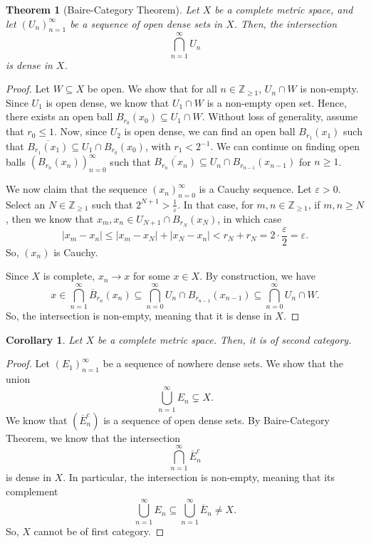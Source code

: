 \documentclass[a4paper, openany]{memoir}
\theoremstyle{definition}
\theoremstyle{plain}
\newtheorem{theorem}[definition]{Theorem}
\newtheorem{corollary}[definition]{Corollary}
\begin{document}
    \begin{theorem}[Baire-Category Theorem]
        Let $X$ be a complete metric space, and let $(U_n)_{n=1}^\infty$ be a sequence of open dense sets in $X$. Then, the intersection
        \[\bigcap_{n=1}^\infty U_n\]
        is dense in $X$.
    \end{theorem}
    \begin{proof}
        Let $W \subseteq X$ be open. We show that for all $n \in \mathbb{Z}_{\geq 1}$, $U_n \cap W$ is non-empty. Since $U_1$ is open dense, we know that $U_1 \cap W$ is a non-empty open set. Hence, there exists an open ball $B_{r_0}(x_0) \subseteq U_1 \cap W$. Without loss of generality, assume that $r_0 \leq 1$. Now, since $U_2$ is open dense, we can find an open ball $B_{r_1}(x_1)$ such that $\overline{B_{r_1}(x_1)} \subseteq U_1 \cap B_{r_0}(x_0)$, with $r_1 < 2^{-1}$. We can continue on finding open balls $(B_{r_n}(x_n))_{n=0}^\infty$ such that $\overline{B_{r_n}(x_n)} \subseteq U_n \cap B_{r_{n-1}}(x_{n-1})$ for $n \geq 1$. 
        
        We now claim that the sequence $(x_n)_{n=0}^\infty$ is a Cauchy sequence. Let $\varepsilon > 0$. Select an $N \in \mathbb{Z}_{\geq 1}$ such that $2^{N+1} > \frac{1}{\varepsilon}$. In that case, for $m, n \in \mathbb{Z}_{\geq 1}$, if $m, n \geq N$, then we know that $x_m, x_n \in U_{N+1} \cap B_{r_N}(x_N)$, in which case
        \[|x_m - x_n| \leq |x_m - x_N| + |x_N - x_n| < r_N + r_N = 2 \cdot \frac{\varepsilon}{2} = \varepsilon.\]
        So, $(x_n)$ is Cauchy.
        
        Since $X$ is complete, $x_n \to x$ for some $x \in X$. By construction, we have 
        \[x \in \bigcap_{n=1}^\infty \overline{B}_{r_n}(x_n) \subseteq \bigcap_{n=0}^\infty U_n \cap B_{r_{n-1}}(x_{n-1}) \subseteq \bigcap_{n=0}^\infty U_n \cap W.\]
        So, the intersection is non-empty, meaning that it is dense in $X$.
    \end{proof}
    
    \begin{corollary}
        Let $X$ be a complete metric space. Then, it is of second category.
    \end{corollary}
    \begin{proof}
        Let $(E_1)_{n=1}^\infty$ be a sequence of nowhere dense sets. We show that the union
        \[\bigcup_{n=1}^\infty E_n \subsetneq X.\]
        We know that $(\overline{E}_n^c)$ is a sequence of open dense sets. By Baire-Category Theorem, we know that the intersection
        \[\bigcap_{n=1}^\infty \overline{E}_n^c\]
        is dense in $X$. In particular, the intersection is non-empty, meaning that its complement
        \[\bigcup_{n=1}^\infty E_n \subseteq \bigcup_{n=1}^\infty \overline{E}_n \neq X.\]
        So, $X$ cannot be of first category.
    \end{proof}
    \newpage
\end{document}
